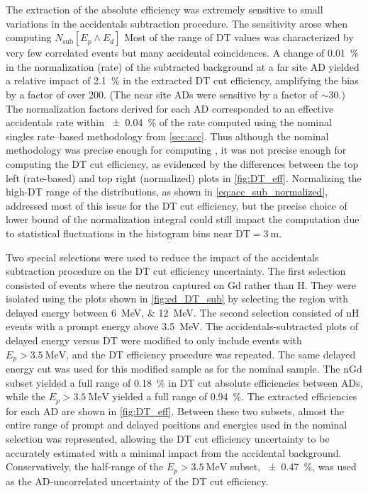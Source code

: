 The extraction of the absolute efficiency was extremely sensitive
to small variations in the accidentals subtraction procedure.
The sensitivity arose when computing $N_\text{sub}[E_p \wedge E_d]$
Most of the range of DT values was characterized by
very few correlated events but many accidental coincidences.
A change of \SI{0.01}{\percent} in the normalization (rate)
of the subtracted background at a far site AD
yielded a relative impact of \SI{2.1}{\percent} in the extracted DT cut efficiency,
amplifying the bias by a factor of over 200.
(The near site ADs were sensitive by a factor of $\sim30$.)
The normalization factors derived for each AD
corresponded to an effective accidentals rate
within \SI{\pm0.04}{\percent} of the rate computed
using the nominal singles rate--based methodology from \cref{sec:acc}.
Thus although the nominal methodology was precise enough
for computing \thetaot{},
it was not precise enough for computing the DT cut efficiency,
as evidenced by the differences between the top left (rate-based)
and top right (normalized) plots in \cref{fig:DT_eff}.
Normalizing the high-DT range of the distributions,
as shown in \cref{eq:acc_sub_normalized},
addressed most of this issue for the DT cut efficiency,
but the precise choice of lower bound of the normalization integral
could still impact the computation
due to statistical fluctuations in the histogram bins near $\text{DT} = \SI{3}{\m}$.

Two special selections were used to reduce the impact of
the accidentals subtraction procedure on the DT cut efficiency uncertainty.
The first selection consisted of events where the neutron captured on Gd
rather than H.
They were isolated using the plots shown in \cref{fig:ed_DT_sub}
by selecting the region with delayed energy between \SIlist{6;12}{\MeV}.
The second selection consisted of nH events
with a prompt energy above \SI{3.5}{\MeV}.
The accidentals-subtracted plots of delayed energy versus DT were
modified to only include events with $E_p > \SI{3.5}{\MeV}$,
and the DT efficiency procedure was repeated.
The same delayed energy cut was used for this modified sample
as for the nominal sample.
The nGd subset yielded a full range of \SI{0.18}{\percent}
in DT cut absolute efficiencies between ADs,
while the $E_p > \SI{3.5}{\MeV}$ yielded a full range of \SI{0.94}{\percent}.
The extracted efficiencies for each AD are shown in \cref{fig:DT_eff}.
Between these two subsets, almost the entire range
of prompt and delayed positions and energies used in the nominal selection was represented,
allowing the DT cut efficiency uncertainty to be accurately estimated
with a minimal impact from the accidental background.
Conservatively, the half-range of the $E_p > \SI{3.5}{\MeV}$ subset,
\SI{\pm0.47}{\percent}, was
used as the AD-uncorrelated uncertainty of the DT cut efficiency.


